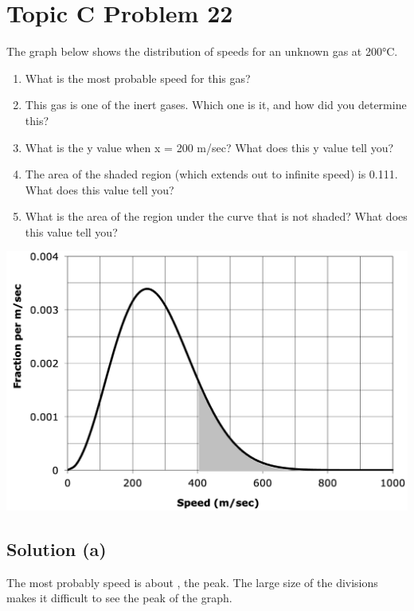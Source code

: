\documentclass[10pt]{article}
\begin{document}
    \section{Topic C Problem 22}
        The graph below shows the distribution of speeds for an unknown gas at 200\unit{\celsius}.
        \begin{enumerate} [label=\alph*)]
            \item What is the most probable speed for this gas?
            \item This gas is one of the inert gases. Which one is it, and how did you determine this?
            \item What is the y value when x = 200 m/sec? What does this y value tell you?
            \item The area of the shaded region (which extends out to infinite speed) is 0.111. What does this value tell you?
            \item What is the area of the region under the curve that is not shaded? What does this value tell you?
        \end{enumerate}
        \begin{center}
            \includegraphics[width=\textwidth]{picture_C-22.png}
        \end{center}

        \subsection{Solution (a)}
            The most probably speed is about , the peak. 
            The large size of the divisions makes it difficult to see the peak of the graph.
\end{document}

